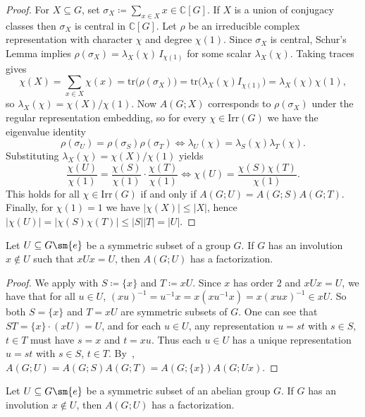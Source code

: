 \documentclass{file}
\begin{document}
\begin{proof}
For $X\subseteq G$, set $\sigma_X\coloneqq  \sum_{x\in X}x\in\mathbb{C}[G]$.
If $X$ is a union of conjugacy classes then $\sigma_X$ is central in $\mathbb{C}[G]$.
Let $\rho$ be an irreducible complex representation with character $\chi$ and degree $\chi(1)$.
Since $\sigma_X$ is central, Schur's Lemma implies $\rho(\sigma_X)=\lambda_X(\chi)\,I_{\chi(1)}$
for some scalar $\lambda_X(\chi)$.
Taking traces gives
\[
\chi(X)=\sum_{x\in X}\chi(x)=\mathrm{tr}\bigl(\rho(\sigma_X)\bigr)
=\mathrm{tr}\bigl(\lambda_X(\chi)I_{\chi(1)}\bigr)=\lambda_X(\chi)\chi(1),
\]
so $\lambda_X(\chi)=\chi(X)/\chi(1)$.
Now $A(G;X)$ corresponds to $\rho(\sigma_X)$ under the regular representation embedding,
so for every $\chi\in\mathrm{Irr}(G)$ we have the eigenvalue identity
\[
\rho(\sigma_U)=\rho(\sigma_S)\rho(\sigma_T)
\iff
\lambda_U(\chi)=\lambda_S(\chi)\lambda_T(\chi).
\]
Substituting $\lambda_X(\chi)=\chi(X)/\chi(1)$ yields
\[
\frac{\chi(U)}{\chi(1)}=\frac{\chi(S)}{\chi(1)}\cdot\frac{\chi(T)}{\chi(1)}
\iff
\chi(U)=\frac{\chi(S)\chi(T)}{\chi(1)}.
\]
This holds for all $\chi\in\mathrm{Irr}(G)$ if and only if $A(G;U)=A(G;S)A(G;T)$.
Finally, for $\chi(1)=1$ we have $|\chi(X)|\le |X|$, hence
$|\chi(U)|=|\chi(S)\chi(T)|\le |S||T|=|U|$.
\end{proof}

\begin{lem}\label{lem:xUx=U}
Let $U\subseteq G\sm\{e\}$ be a symmetric subset of a group $G$. 
If $G$ has an involution $x\notin U$ such that $xUx=U$, then $A(G;U)$ has a factorization. 
\end{lem}

\begin{proof}
We apply  with $S\coloneqq\{x\}$ and $T\coloneqq xU$.  Since $x$ has order $2$ and $xUx=U$, we have that for all $u \in U$, $(xu)^{-1} = u^{-1}x = x(xu^{-1}x) = x(xux)^{-1} \in xU$.  So both $S=\{x\}$ and $T=xU$ are symmetric subsets of $G$.  
One can see that 
$ST=\{x\}\cdot (xU)=U$, and for each $u \in U$, any representation $u=st$ with $s\in S$, $t\in T$ must have $s=x$ and $t=xu$.  Thus each $u\in U$ has a unique representation $u=st$ with $s\in S$, $t\in T$.
By~, $A(G;U)=A(G;S)A(G;T)=A(G;\{x\})A(G;Ux)$.
\end{proof}

\begin{cor}\label{cor:xUx=x_abelian}
Let $U\subseteq G\sm\{e\}$ be a symmetric subset of an abelian group $G$. 
If $G$ has an involution $x\notin U$, then $A(G;U)$ has a factorization. 
\end{cor}
\end{document}
